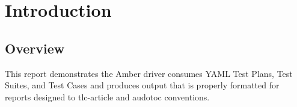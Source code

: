 \section{Introduction}
\subsection{Overview}
This report demonstrates the Amber driver consumes YAML Test Plans, Test Suites,
and Test Cases and produces output that is properly formatted for reports
designed to tlc-article and audotoc conventions.

